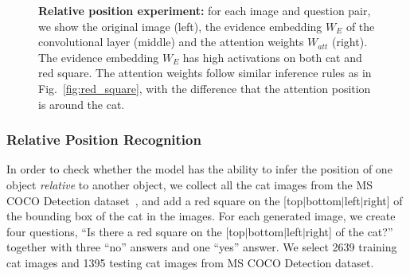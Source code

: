 \begin{figure}[t]
\vspace{-0.05in}
\caption{\textbf{Relative position experiment:}
for each image and question pair, we show the original image (left), the evidence embedding $W_E$ of the convolutional layer (middle) and the attention weights $W_{att}$ (right). The evidence embedding $W_E$ has high activations on both cat and red square. 
The attention weights follow similar inference rules as in Fig.~\ref{fig:red_square}, with the difference that the attention position is around the cat.
}\label{fig:cat_square}
\vspace{-0.2in}
\end{figure}


\vspace{-0.1in}
\subsubsection{Relative Position Recognition}
In order to check whether the model has the ability to infer the  position of one object \textit{relative} to another object,
we collect all the cat images from the MS COCO Detection dataset~\cite{lin2014microsoft}, and add a red square on the [top$\mid$bottom$\mid$left$\mid$right] of the bounding box of the cat in the images.
For each generated image, we create four questions, ``Is there a red square on the [top$\mid$bottom$\mid$left$\mid$right] of the cat?'' together with three ``no'' answers and one ``yes'' answer. 
We select 2639 training cat images and 1395 testing cat images from MS COCO Detection dataset. 

